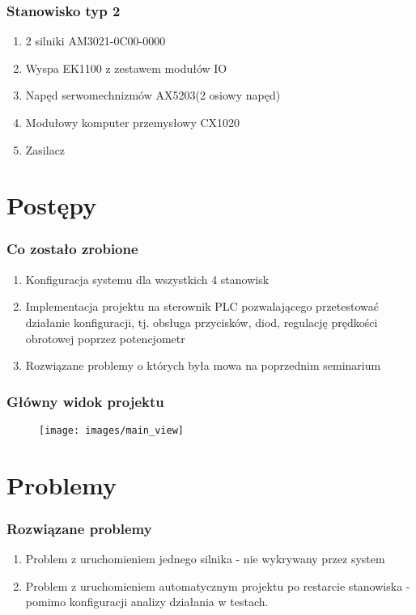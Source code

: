 \documentclass[ucs]{beamer}
\begin{document}
\begin{frame}
\frametitle{Stanowisko typ 2}
\begin{enumerate}
    \item 2 silniki AM3021-0C00-0000
    \item Wyspa EK1100 z zestawem modułów IO
    \item Napęd serwomechnizmów AX5203(2 osiowy napęd)
    \item Modułowy komputer przemysłowy CX1020
    \item Zasilacz
\end{enumerate}
\end{frame}

\section{Postępy}
\begin{frame}
\frametitle{Co zostało zrobione}
\begin{enumerate}
    \item Konfiguracja systemu dla wszystkich 4 stanowisk
    \item Implementacja projektu na sterownik PLC pozwalającego przetestować działanie konfiguracji, tj. obsługa przycisków, diod, regulację prędkości obrotowej poprzez potencjometr
    \item Rozwiązane problemy o których była mowa na poprzednim seminarium
\end{enumerate}
\end{frame}

\begin{frame}
\frametitle{Główny widok projektu}
\begin{figure}[!htb]	
\centering 	          
\texttt{[image: images/main\_view]}
\end{figure}
\end{frame}

\section{Problemy}
\begin{frame}
\frametitle{Rozwiązane problemy}
\begin{enumerate}
    \item Problem z uruchomieniem jednego silnika - nie wykrywany przez system
    \item Problem z uruchomieniem automatycznym projektu po restarcie stanowiska - pomimo konfiguracji analizy działania w testach.
\end{enumerate}
\end{frame}
\end{document}
